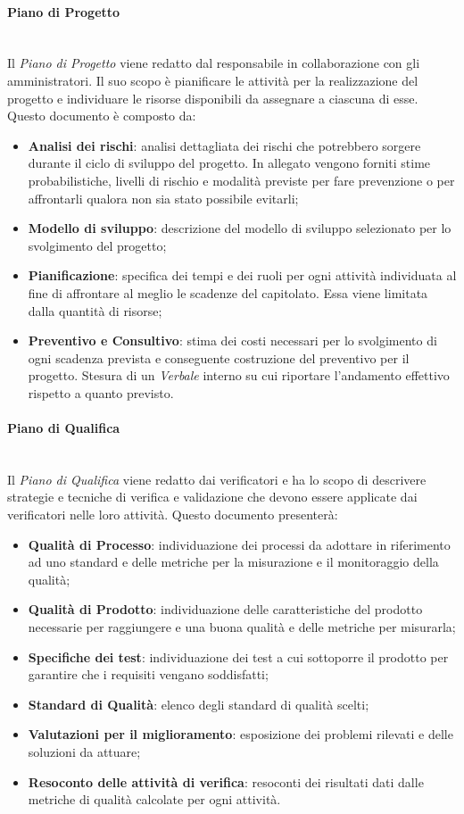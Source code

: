 \paragraph{Piano di Progetto}\mbox{}\\ [1mm]
Il \textit{Piano di Progetto} viene redatto dal responsabile in collaborazione con gli amministratori. Il suo scopo è pianificare le attività per la realizzazione del progetto e individuare le risorse disponibili da assegnare a ciascuna di esse.
Questo documento è composto da:
\begin{itemize}
	\item \textbf{Analisi dei rischi}: analisi dettagliata dei rischi che potrebbero sorgere durante il ciclo di sviluppo del progetto. In allegato vengono forniti stime probabilistiche, livelli di rischio e modalità previste per fare prevenzione o per affrontarli qualora non sia stato possibile evitarli;
	\item \textbf{Modello di sviluppo}\glo: descrizione del modello di sviluppo selezionato per lo svolgimento del progetto;
	\item \textbf{Pianificazione}: specifica dei tempi e dei ruoli per ogni attività individuata al fine di affrontare al meglio le scadenze del capitolato\glo. Essa viene limitata dalla quantità di risorse;
	\item \textbf{Preventivo e Consultivo}: stima dei costi necessari per lo svolgimento di ogni scadenza prevista e conseguente costruzione del preventivo per il progetto. Stesura di un \textit{Verbale} interno su cui riportare l'andamento effettivo rispetto a quanto previsto.
\end{itemize}
\paragraph{Piano di Qualifica}\mbox{}\\ [1mm]
Il \textit{Piano di Qualifica} viene redatto dai verificatori e ha lo scopo di descrivere strategie e tecniche di verifica e validazione che devono essere applicate dai verificatori nelle loro attività.
Questo documento presenterà:
\begin{itemize}
	\item \textbf{Qualità di Processo}: individuazione dei processi da adottare in riferimento ad uno standard e delle metriche per la misurazione e il monitoraggio della qualità;
	\item \textbf{Qualità di Prodotto}: individuazione delle caratteristiche del prodotto necessarie per raggiungere e una buona qualità e delle metriche per misurarla;
	\item \textbf{Specifiche dei test}: individuazione dei test a cui sottoporre il prodotto per garantire che i requisiti vengano soddisfatti;
	\item \textbf{Standard di Qualità}: elenco degli standard di qualità scelti;
	\item \textbf{Valutazioni per il miglioramento}: esposizione dei problemi rilevati e delle soluzioni da attuare;
	\item \textbf{Resoconto delle attività di verifica}: resoconti dei risultati dati dalle metriche di qualità calcolate per ogni attività.
\end{itemize}
